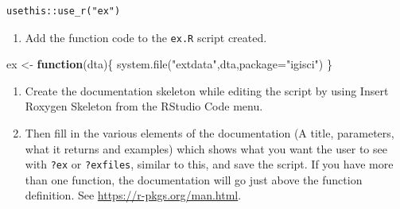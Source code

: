 \documentclass[
]{book}
\newenvironment{Shaded}{\begin{snugshade}}{\end{snugshade}}
\newcommand{\AttributeTok}[1]{\textcolor[rgb]{0.61,0.61,0.61}{#1}}
\newcommand{\ControlFlowTok}[1]{\textcolor[rgb]{0.27,0.27,0.27}{\textbf{#1}}}
\newcommand{\FunctionTok}[1]{\textcolor[rgb]{0,0,0}{#1}}
\newcommand{\NormalTok}[1]{#1}
\newcommand{\OtherTok}[1]{\textcolor[rgb]{0.37,0.37,0.37}{#1}}
\newcommand{\StringTok}[1]{\textcolor[rgb]{0.5,0.5,0.5}{#1}}
\providecommand{\tightlist}{%
  \setlength{\itemsep}{0pt}\setlength{\parskip}{0pt}}
\begin{document}
\begin{verbatim}
usethis::use_r("ex")
\end{verbatim}

\begin{enumerate}
\def\labelenumi{\arabic{enumi}.}
\setcounter{enumi}{1}
\tightlist
\item
  Add the function code to the \texttt{ex.R} script created.
\end{enumerate}

\begin{Shaded}
\begin{Highlighting}[]
\NormalTok{ex }\OtherTok{\textless{}{-}} \ControlFlowTok{function}\NormalTok{(dta)\{}
  \FunctionTok{system.file}\NormalTok{(}\StringTok{"extdata"}\NormalTok{,dta,}\AttributeTok{package=}\StringTok{"igisci"}\NormalTok{)}
\NormalTok{  \}}
\end{Highlighting}
\end{Shaded}

\begin{enumerate}
\def\labelenumi{\arabic{enumi}.}
\setcounter{enumi}{2}
\item
  Create the documentation skeleton while editing the script by using Insert Roxygen Skeleton from the RStudio Code menu.
\item
  Then fill in the various elements of the documentation (A title, parameters, what it returns and examples) which shows what you want the user to see with \texttt{?ex} or \texttt{?exfiles}, similar to this, and save the script. If you have more than one function, the documentation will go just above the function definition. See \url{https://r-pkgs.org/man.html}.
\end{enumerate}
\end{document}
